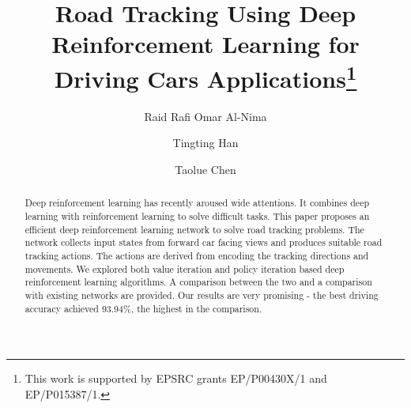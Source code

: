 \documentclass{svproc}
\begin{document}
	\mainmatter              %
	\title{Road Tracking Using Deep Reinforcement Learning for Driving Cars Applications\thanks{This work is supported by EPSRC grants EP/P00430X/1 and EP/P015387/1.}}
	\author{Raid Rafi Omar Al-Nima \and Tingting Han \and 
		Taolue Chen}
	\maketitle              %
	\begin{abstract}
		Deep reinforcement learning has recently aroused wide attentions. It combines deep learning with reinforcement learning to solve difficult tasks. This paper proposes an efficient deep reinforcement learning network to solve road tracking problems. The network collects input states from forward car facing views and produces suitable road tracking actions. The actions are derived from encoding the tracking directions and movements. We explored both value iteration and policy iteration based deep reinforcement learning algorithms. A comparison between the two and a comparison with existing networks are provided. Our results are very promising - the best driving accuracy achieved 93.94\%, the highest in the comparison. 
	\end{abstract}
\end{document}

